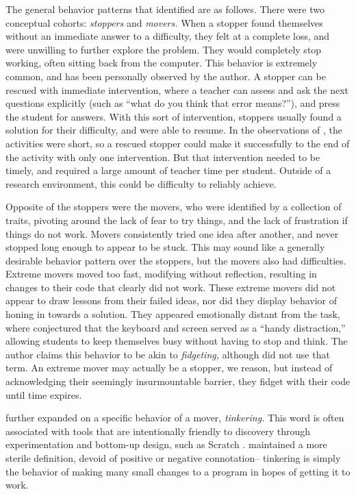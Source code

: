 The general behavior patterns that \citet{perkins-1986} identified are as follows. There were two conceptual cohorts: \emph{stoppers} and \emph{movers.} When a stopper found themselves without an immediate answer to a difficulty, they felt at a complete loss, and were unwilling to further explore the problem. They would completely stop working, often sitting back from the computer. This behavior is extremely common, and has been personally observed by the author. A stopper can be rescued with immediate intervention, where a teacher can assess and ask the next questions explicitly (such as ``what do you think that error means?''), and press the student for answers. With this sort of intervention, stoppers usually found a solution for their difficulty, and were able to resume. In the observations of \citeauthor{perkins-1986}, the activities were short, so a rescued stopper could make it successfully to the end of the activity with only one intervention. But that intervention needed to be timely, and required a large amount of teacher time per student. Outside of a research environment, this could be difficulty to reliably achieve.

Opposite of the stoppers were the movers, who were identified by a collection of traits, pivoting around the lack of fear to try things, and the lack of frustration if things do not work. Movers consistently tried one idea after another, and never stopped long enough to appear to be stuck. This may sound like a generally desirable behavior pattern over the stoppers, but the movers also had difficulties. Extreme movers moved too fast, modifying without reflection, resulting in changes to their code that clearly did not work. These extreme movers did not appear to draw lessons from their failed ideas, nor did they display behavior of honing in towards a solution. They appeared emotionally distant from the task, where \citeauthor{perkins-1986} conjectured that the keyboard and screen served as a ``handy distraction,'' allowing students to keep themselves busy without having to stop and think. The author claims this behavior to be akin to \emph{fidgeting,} although \citeauthor{perkins-1986} did not use that term. An extreme mover may actually be a stopper, we reason, but instead of acknowledging their seemingly insurmountable barrier, they fidget with their code until time expires.

\citet{perkins-1986} further expanded on a specific behavior of a mover, \emph{tinkering.} This word is often associated with tools that are intentionally friendly to discovery through experimentation and bottom-up design, such as Scratch \citep{resnick2009scratch}. \citeauthor{perkins-1986} maintained a more sterile definition, devoid of positive or negative connotation-- tinkering is simply the behavior of making many small changes to a program in hopes of getting it to work.

